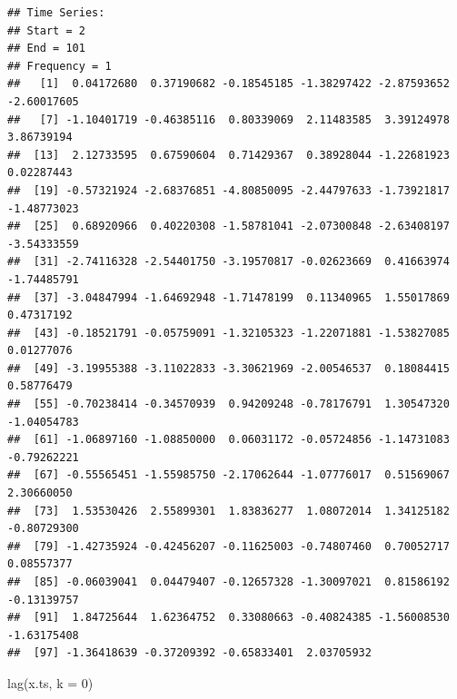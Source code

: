 \documentclass[
]{book}
\newenvironment{Shaded}{\begin{snugshade}}{\end{snugshade}}
\newcommand{\AttributeTok}[1]{\textcolor[rgb]{0.77,0.63,0.00}{#1}}
\newcommand{\DecValTok}[1]{\textcolor[rgb]{0.00,0.00,0.81}{#1}}
\newcommand{\FunctionTok}[1]{\textcolor[rgb]{0.00,0.00,0.00}{#1}}
\newcommand{\NormalTok}[1]{#1}
\theoremstyle{definition}
\theoremstyle{definition}
\theoremstyle{definition}
\theoremstyle{definition}
\theoremstyle{remark}
\begin{document}
\begin{verbatim}
## Time Series:
## Start = 2 
## End = 101 
## Frequency = 1 
##   [1]  0.04172680  0.37190682 -0.18545185 -1.38297422 -2.87593652 -2.60017605
##   [7] -1.10401719 -0.46385116  0.80339069  2.11483585  3.39124978  3.86739194
##  [13]  2.12733595  0.67590604  0.71429367  0.38928044 -1.22681923  0.02287443
##  [19] -0.57321924 -2.68376851 -4.80850095 -2.44797633 -1.73921817 -1.48773023
##  [25]  0.68920966  0.40220308 -1.58781041 -2.07300848 -2.63408197 -3.54333559
##  [31] -2.74116328 -2.54401750 -3.19570817 -0.02623669  0.41663974 -1.74485791
##  [37] -3.04847994 -1.64692948 -1.71478199  0.11340965  1.55017869  0.47317192
##  [43] -0.18521791 -0.05759091 -1.32105323 -1.22071881 -1.53827085  0.01277076
##  [49] -3.19955388 -3.11022833 -3.30621969 -2.00546537  0.18084415  0.58776479
##  [55] -0.70238414 -0.34570939  0.94209248 -0.78176791  1.30547320 -1.04054783
##  [61] -1.06897160 -1.08850000  0.06031172 -0.05724856 -1.14731083 -0.79262221
##  [67] -0.55565451 -1.55985750 -2.17062644 -1.07776017  0.51569067  2.30660050
##  [73]  1.53530426  2.55899301  1.83836277  1.08072014  1.34125182 -0.80729300
##  [79] -1.42735924 -0.42456207 -0.11625003 -0.74807460  0.70052717  0.08557377
##  [85] -0.06039041  0.04479407 -0.12657328 -1.30097021  0.81586192 -0.13139757
##  [91]  1.84725644  1.62364752  0.33080663 -0.40824385 -1.56008530 -1.63175408
##  [97] -1.36418639 -0.37209392 -0.65833401  2.03705932
\end{verbatim}

\begin{Shaded}
\begin{Highlighting}[]
\FunctionTok{lag}\NormalTok{(x.ts, }\AttributeTok{k =} \DecValTok{0}\NormalTok{)}
\end{Highlighting}
\end{Shaded}
\end{document}
